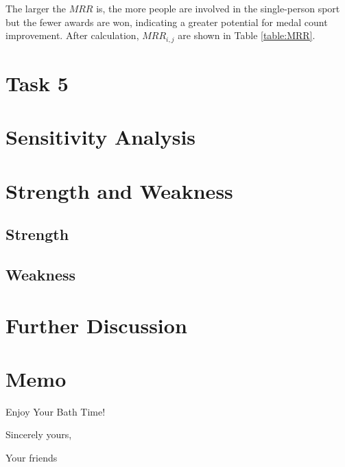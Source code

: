 \documentclass{mcmthesis}
\begin{document}
The larger the $MRR$ is, the more people are involved in the single-person sport but the fewer awards are won, indicating a greater potential for medal count improvement. After calculation, $MRR_{i,j}$ are shown in Table \ref{table:MRR}.







	\section{Task 5}
	
	\section{Sensitivity Analysis}
	
	\section{Strength and Weakness}
	\subsection{Strength}
	\subsection{Weakness}
	
	\section{Further Discussion}
	
	
	
	\newpage
	\section*{Memo} %
	
	\begin{letter}{Enjoy Your Bath Time!}
		
		
		\vspace{\parskip}
		
		Sincerely yours,
		
		Your friends
		
	\end{letter}
	
\end{document}

